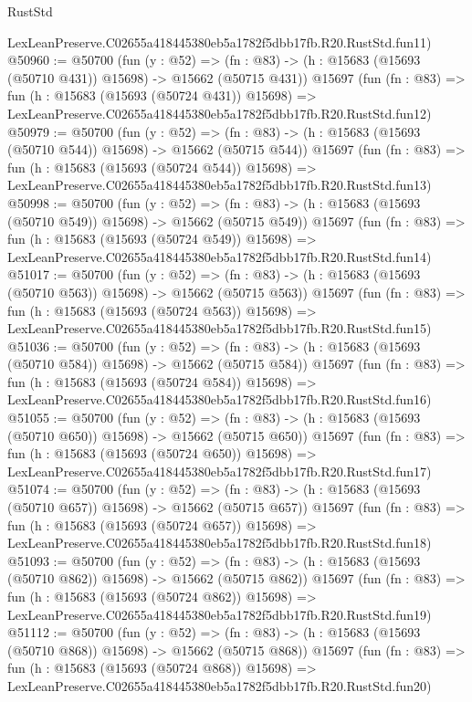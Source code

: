 \begin{lexlean}{RustStd}
\begin{coremodule}
    LexLeanPreserve.C02655a418445380eb5a1782f5dbb17fb.R20.RustStd.fun11)
@50960 := @50700
    (fun (y : @52) =>
    (fn : @83) -> (h : @15683 (@15693 (@50710 @431)) @15698) -> @15662 (@50715 @431))
    @15697
    (fun (fn : @83) =>
    fun (h : @15683 (@15693 (@50724 @431)) @15698) =>
    LexLeanPreserve.C02655a418445380eb5a1782f5dbb17fb.R20.RustStd.fun12)
@50979 := @50700
    (fun (y : @52) =>
    (fn : @83) -> (h : @15683 (@15693 (@50710 @544)) @15698) -> @15662 (@50715 @544))
    @15697
    (fun (fn : @83) =>
    fun (h : @15683 (@15693 (@50724 @544)) @15698) =>
    LexLeanPreserve.C02655a418445380eb5a1782f5dbb17fb.R20.RustStd.fun13)
@50998 := @50700
    (fun (y : @52) =>
    (fn : @83) -> (h : @15683 (@15693 (@50710 @549)) @15698) -> @15662 (@50715 @549))
    @15697
    (fun (fn : @83) =>
    fun (h : @15683 (@15693 (@50724 @549)) @15698) =>
    LexLeanPreserve.C02655a418445380eb5a1782f5dbb17fb.R20.RustStd.fun14)
@51017 := @50700
    (fun (y : @52) =>
    (fn : @83) -> (h : @15683 (@15693 (@50710 @563)) @15698) -> @15662 (@50715 @563))
    @15697
    (fun (fn : @83) =>
    fun (h : @15683 (@15693 (@50724 @563)) @15698) =>
    LexLeanPreserve.C02655a418445380eb5a1782f5dbb17fb.R20.RustStd.fun15)
@51036 := @50700
    (fun (y : @52) =>
    (fn : @83) -> (h : @15683 (@15693 (@50710 @584)) @15698) -> @15662 (@50715 @584))
    @15697
    (fun (fn : @83) =>
    fun (h : @15683 (@15693 (@50724 @584)) @15698) =>
    LexLeanPreserve.C02655a418445380eb5a1782f5dbb17fb.R20.RustStd.fun16)
@51055 := @50700
    (fun (y : @52) =>
    (fn : @83) -> (h : @15683 (@15693 (@50710 @650)) @15698) -> @15662 (@50715 @650))
    @15697
    (fun (fn : @83) =>
    fun (h : @15683 (@15693 (@50724 @650)) @15698) =>
    LexLeanPreserve.C02655a418445380eb5a1782f5dbb17fb.R20.RustStd.fun17)
@51074 := @50700
    (fun (y : @52) =>
    (fn : @83) -> (h : @15683 (@15693 (@50710 @657)) @15698) -> @15662 (@50715 @657))
    @15697
    (fun (fn : @83) =>
    fun (h : @15683 (@15693 (@50724 @657)) @15698) =>
    LexLeanPreserve.C02655a418445380eb5a1782f5dbb17fb.R20.RustStd.fun18)
@51093 := @50700
    (fun (y : @52) =>
    (fn : @83) -> (h : @15683 (@15693 (@50710 @862)) @15698) -> @15662 (@50715 @862))
    @15697
    (fun (fn : @83) =>
    fun (h : @15683 (@15693 (@50724 @862)) @15698) =>
    LexLeanPreserve.C02655a418445380eb5a1782f5dbb17fb.R20.RustStd.fun19)
@51112 := @50700
    (fun (y : @52) =>
    (fn : @83) -> (h : @15683 (@15693 (@50710 @868)) @15698) -> @15662 (@50715 @868))
    @15697
    (fun (fn : @83) =>
    fun (h : @15683 (@15693 (@50724 @868)) @15698) =>
    LexLeanPreserve.C02655a418445380eb5a1782f5dbb17fb.R20.RustStd.fun20)

\end{coremodule}
\end{lexlean}
